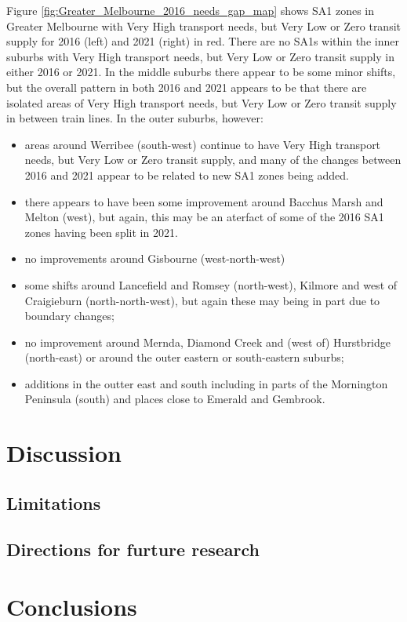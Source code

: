 \documentclass[preprint, 3p,
authoryear]{elsarticle} %
\providecommand{\tightlist}{%
  \setlength{\itemsep}{0pt}\setlength{\parskip}{0pt}}
\begin{document}
Figure \ref{fig:Greater_Melbourne_2016_needs_gap_map} shows SA1 zones in
Greater Melbourne with Very High transport needs, but Very Low or Zero
transit supply for 2016 (left) and 2021 (right) in red. There are no
SA1s within the inner suburbs with Very High transport needs, but Very
Low or Zero transit supply in either 2016 or 2021. In the middle suburbs
there appear to be some minor shifts, but the overall pattern in both
2016 and 2021 appears to be that there are isolated areas of Very High
transport needs, but Very Low or Zero transit supply in between train
lines. In the outer suburbs, however:

\begin{itemize}
\tightlist
\item
  areas around Werribee (south-west) continue to have Very High
  transport needs, but Very Low or Zero transit supply, and many of the
  changes between 2016 and 2021 appear to be related to new SA1 zones
  being added.
\item
  there appears to have been some improvement around Bacchus Marsh and
  Melton (west), but again, this may be an aterfact of some of the 2016
  SA1 zones having been split in 2021.\\
\item
  no improvements around Gisbourne (west-north-west)
\item
  some shifts around Lancefield and Romsey (north-west), Kilmore and
  west of Craigieburn (north-north-west), but again these may being in
  part due to boundary changes;
\item
  no improvement around Mernda, Diamond Creek and (west of) Hurstbridge
  (north-east) or around the outer eastern or south-eastern suburbs;
\item
  additions in the outter east and south including in parts of the
  Mornington Peninsula (south) and places close to Emerald and Gembrook.
\end{itemize}

\section{Discussion}\label{discussion}

\subsection{Limitations}\label{limitations}

\subsection{Directions for furture
research}\label{directions-for-furture-research}

\section{Conclusions}\label{conclusions}

\renewcommand\refname{References}

\end{document}
